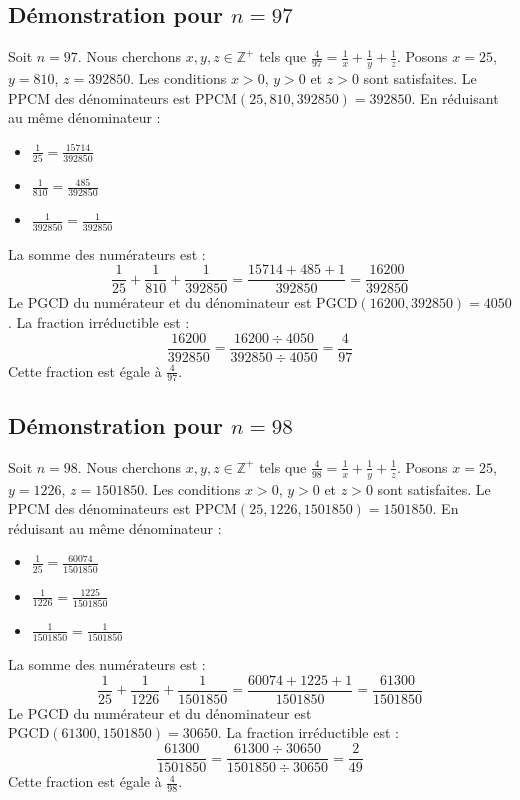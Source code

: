 \documentclass[11pt,a4paper]{article}
\begin{document}
\subsection{Démonstration pour $n = 97$}
Soit $n = 97$. Nous cherchons $x, y, z \in \mathbb{Z}^{+}$ tels que $\frac{4}{97} = \frac{1}{x} + \frac{1}{y} + \frac{1}{z}$.
Posons $x = 25$, $y = 810$, $z = 392850$.
Les conditions $x > 0$, $y > 0$ et $z > 0$ sont satisfaites.
Le PPCM des dénominateurs est $\text{PPCM}(25, 810, 392850) = 392850$.
En réduisant au même dénominateur :
\begin{itemize}
    \item $\frac{1}{25} = \frac{15714}{392850}$
    \item $\frac{1}{810} = \frac{485}{392850}$
    \item $\frac{1}{392850} = \frac{1}{392850}$
\end{itemize}
La somme des numérateurs est :
$$ \frac{1}{25} + \frac{1}{810} + \frac{1}{392850} = \frac{15714 + 485 + 1}{392850} = \frac{16200}{392850} $$
Le PGCD du numérateur et du dénominateur est $\text{PGCD}(16200, 392850) = 4050$.
La fraction irréductible est :
$$ \frac{16200}{392850} = \frac{16200 \div 4050}{392850 \div 4050} = \frac{4}{97} $$
Cette fraction est égale à $\frac{4}{97}$.

\subsection{Démonstration pour $n = 98$}
Soit $n = 98$. Nous cherchons $x, y, z \in \mathbb{Z}^{+}$ tels que $\frac{4}{98} = \frac{1}{x} + \frac{1}{y} + \frac{1}{z}$.
Posons $x = 25$, $y = 1226$, $z = 1501850$.
Les conditions $x > 0$, $y > 0$ et $z > 0$ sont satisfaites.
Le PPCM des dénominateurs est $\text{PPCM}(25, 1226, 1501850) = 1501850$.
En réduisant au même dénominateur :
\begin{itemize}
    \item $\frac{1}{25} = \frac{60074}{1501850}$
    \item $\frac{1}{1226} = \frac{1225}{1501850}$
    \item $\frac{1}{1501850} = \frac{1}{1501850}$
\end{itemize}
La somme des numérateurs est :
$$ \frac{1}{25} + \frac{1}{1226} + \frac{1}{1501850} = \frac{60074 + 1225 + 1}{1501850} = \frac{61300}{1501850} $$
Le PGCD du numérateur et du dénominateur est $\text{PGCD}(61300, 1501850) = 30650$.
La fraction irréductible est :
$$ \frac{61300}{1501850} = \frac{61300 \div 30650}{1501850 \div 30650} = \frac{2}{49} $$
Cette fraction est égale à $\frac{4}{98}$.
\end{document}
